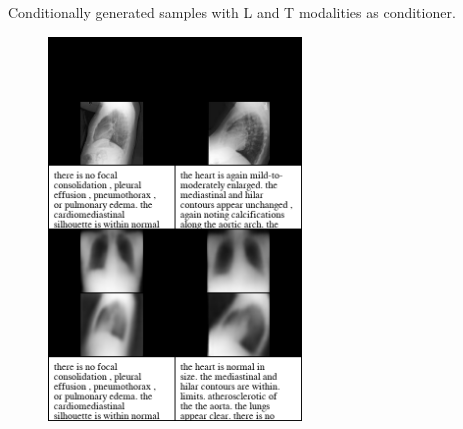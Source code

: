     \begin{frame}{Conditionally generated samples with L and T modalities as conditioner.}

        \begin{figure}
            \centering
            \includegraphics[width=0.6\textwidth, height = 0.85\textheight, keepaspectratio]{slides/cond_gen/Lateral_text_blacked.png}

        \end{figure}
    \end{frame}

